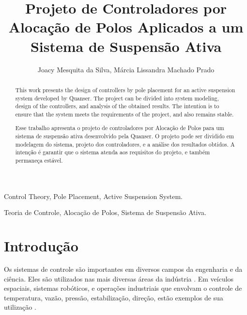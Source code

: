 \documentclass[journal,brazil,english]{IEEEtran}
\begin{document}
\title{Projeto de Controladores por Alocação de Polos Aplicados a um Sistema de Suspensão Ativa}

\author{Joacy Mesquita da Silva, Márcia Lissandra Machado Prado}

\maketitle

\begin{abstract}
This work presents the design of controllers by pole placement for an active suspension system developed by Quanser. The project can be divided into system modeling, design of the controllers, and analysis of the obtained results. The intention is to ensure that the system meets the requirements of the project, and also remains stable.
\end{abstract}

\begin{IEEEkeywords}
Control Theory, Pole Placement, Active Suspension System.
\end{IEEEkeywords}

\begin{abstract}
Esse trabalho apresenta o projeto de controladores por Alocação de Polos para um sistema de suspensão ativa desenvolvido pela Quanser. O projeto pode ser dividido em modelagem do sistema, projeto dos controladores, e a análise dos resultados obtidos. A intenção é garantir que o sistema atenda aos requisitos do projeto, e também permaneça estável.
\end{abstract}

\begin{IEEEkeywords}
Teoria de Controle, Alocação de Polos, Sistema de Suspensão Ativa.
\end{IEEEkeywords}

\IEEEpeerreviewmaketitle

\section{Introdução}\label{introducao}
Os sistemas de controle são importantes em diversos campos da engenharia e da ciência. Eles são utilizados nas mais diversas áreas da indústria \cite{ogata}. Em veículos espaciais, sistemas robóticos, e operações industriais que envolvam o controle de temperatura, vazão, pressão, estabilização, direção, estão exemplos de sua utilização \cite{nise}.

\end{document}

